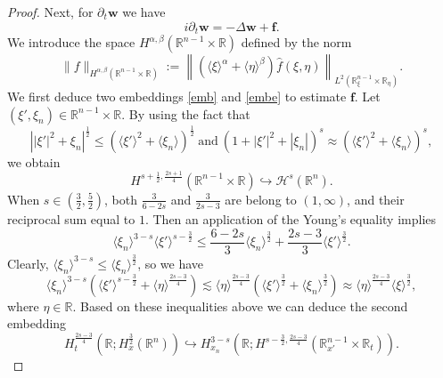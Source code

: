\documentclass[preprint,compress,12pt]{elsarticle}
\numberwithin{equation}{section}
\begin{document}
\begin{proof}
	Next, for $\partial_{t}\boldsymbol{w}$ we have
	\begin{equation}\label{par}
		i\partial_{t}\boldsymbol{w}=-\Delta \boldsymbol{w}+\boldsymbol{f}.
	\end{equation}
	We introduce the space $H^{\alpha,\beta}(\mathbb{R}^{n-1}\times \mathbb{R})$ defined by the norm
	\begin{equation}
		\|f\|_{H^{\alpha,\beta}(\mathbb{R}^{n-1}\times \mathbb{R})}:=\left\|\left(\langle \xi \rangle^{\alpha}+\langle\eta\rangle^{\beta}\right)\widehat{f}(\xi,\eta)\right\|_{L^{2}(\mathbb{R}^{n-1}_{\xi}\times\mathbb{R}_{\eta})}.
	\end{equation}
	We first deduce two embeddings \eqref{emb} and \eqref{embe} to estimate $\boldsymbol{f}$. Let $(\xi', \xi_{n})\in \mathbb{R}^{n-1}\times\mathbb{R}$. By using the fact that
	\begin{equation*} \left||\xi'|^{2}+\xi_{n}\right|^{\frac{1}{2}}\leq\left(\langle\xi'\rangle^{2}+\langle\xi_{n}\rangle\right)^{\frac{1}{2}} \ \text{and}\ \left(1+|\xi'|^2+|\xi_n|\right)^s\approx \left(\langle\xi'\rangle^{2}+\langle\xi_{n}\rangle\right)^{s},
	\end{equation*}
	we obtain
	\begin{equation} \label{emb} H^{s+\frac{1}{2},\frac{2s+1}{4}}(\mathbb{R}^{n-1}\times\mathbb{R})\hookrightarrow\mathcal{H}^{s}(\mathbb{R}^{n}).
	\end{equation}
	When $s\in\left(\frac{3}{2},\frac{5}{2}\right)$, both $\frac{3}{6-2s}$ and $\frac{3}{2s-3}$ are belong to $(1,\infty)$, and their reciprocal sum equal to $1$. Then an application of the Young's equality implies
	\begin{equation*}		\langle\xi_{n}\rangle^{3-s}\langle\xi'\rangle^{s-\frac{3}{2}}\leq\frac{6-2s}{3}\langle\xi_{n}\rangle^{\frac{3}{2}}+
		\frac{2s-3}{3}\langle\xi'\rangle^{\frac{3}{2}}.
	\end{equation*}
	Clearly, $\langle\xi_{n}\rangle^{3-s}\leq\langle\xi_{n}\rangle^{\frac{3}{2}}$, so we have
	\begin{equation*}	\langle\xi_{n}\rangle^{3-s}\left(\langle\xi'\rangle^{s-\frac{3}{2}}+\langle\eta\rangle^{\frac{2s-3}{4}}\right)\lesssim\langle\eta\rangle^{\frac{2s-3}{4}}\left(\langle\xi'\rangle^{\frac{3}{2}}+\langle\xi_{n}\rangle^{\frac{3}{2}}\right)\approx\langle\eta\rangle^{\frac{2s-3}{4}}\langle\xi\rangle^{\frac{3}{2}},
	\end{equation*}
	where $\eta\in\mathbb{R}$. Based on these inequalities above we can deduce the second embedding
	\begin{equation}\label{embe}	H_{t}^{\frac{2s-3}{4}}(\mathbb{R};H_{x}^{\frac{3}{2}}(\mathbb{R}^{n}))\hookrightarrow		H^{3-s}_{x_{n}}(\mathbb{R};H^{s-\frac{3}{2},\frac{2s-3}{4}}(\mathbb{R}_{x'}^{n-1}\times\mathbb{R}_{t})).

\end{equation}
\end{proof}
\end{document}
